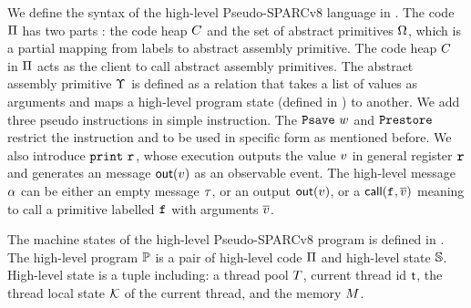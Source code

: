 We define the syntax of the high-level Pseudo-SPARCv8 language
in \Fig{\ref{fig:syntax-of-concur-pseudo-sparc}}.
The code $\Pi$ has two parts :
the code heap $C$
and the set of abstract primitives $\Omega$,
which is a partial mapping from labels to
abstract assembly primitive. The code heap $C$ in $\Pi$
acts as the client to
call abstract assembly primitives.
The abstract assembly primitive $\Upsilon$
is defined as a relation that takes a list of values
as arguments and maps a high-level program state
(defined in \Fig{\ref{fig:machine-state-concur-pseudo-sparc}})
to another.
We add three pseudo instructions in simple instruction.
The $\texttt{Psave} \ w$
and $\texttt{Prestore}$ restrict the instruction \csave{}
and \crestore{} to be used in specific form as
mentioned before.
We also introduce $\texttt{print} \ \texttt{r}_{}$,
whose execution outputs the value $v$ in
general register $\texttt{r}_{}$ and
generates an message $\textsf{out}({v})$
as an observable event.
The high-level message
$\alpha$ can be either an empty message $\tau$, or an output
$\textsf{out}({v})$, or a $\textsf{call}({\texttt{f}_{}, \overline{v}})$ meaning to
call a primitive labelled $\texttt{f}_{}$ with arguments $\overline{v}$.

The machine states of the high-level Pseudo-SPARCv8 program
is defined in \Fig{\ref{fig:machine-state-concur-pseudo-sparc}}.
The high-level program $\mathbb{P}$ is a pair of high-level code
$\Pi$ and high-level state $\mathbb{S}$. High-level
state is a tuple including: a thread pool $T$,
current thread id $\textsf{t}$, the thread local state
$\mathcal{K}$ of the current thread, and the memory $M$.

